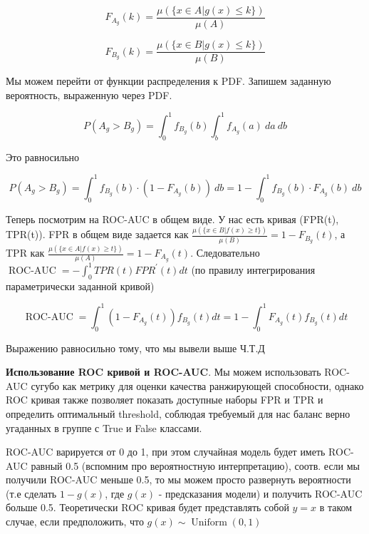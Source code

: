 \documentclass{article}
\begin{document}
    \begin{equation}
        F_{A_{g}}(k) = \frac{\mu(\{x \in A | g(x) \leq k\})}{\mu(A)}
    \end{equation}

    \begin{equation}
        F_{B_{g}}(k) = \frac{\mu(\{x \in B | g(x) \leq k\})}{\mu(B)}
    \end{equation}

    Мы можем перейти от функции распределения к PDF. Запишем заданную вероятность, выраженную через PDF.

    \begin{equation}
        P(A_{g} > B_{g}) = \int_{0}^{1} f_{B_{g}}(b) \int_{b}^{1} f_{A_{g}}(a) \ da \ db
    \end{equation}

    Это равносильно 

    \begin{equation}
        P(A_{g} > B_{g}) = \int_{0}^{1} f_{B_{g}}(b) \cdot (1 - F_{A_{g}}(b)) \ db = 1 - \int_{0}^{1} f_{B_{g}}(b) \cdot F_{A_{g}}(b) \ db
    \end{equation}

    Теперь посмотрим на ROC-AUC в общем виде. 
    У нас есть кривая (FPR(t), TPR(t)). 
    FPR в общем виде задается как $\frac{\mu(\{x \in B | f(x) \geq t\})}{\mu(B)} = 1 - F_{B_{g}}(t)$, 
    а TPR как $\frac{\mu(\{x \in A | f(x) \geq t\})}{\mu(A)} = 1 - F_{A_{g}}(t)$. Следовательно 
    $\operatorname{ROC-AUC} = - \int_{0}^{1} TPR(t) FPR^{'}(t) dt$ 
    (по правилу интегрирования параметрически заданной кривой)

    \begin{equation}
       \operatorname{ROC-AUC} = \int_{0}^{1} (1 - F_{A_{g}}(t)) f_{B_{g}}(t) dt = 1 - \int_{0}^{1} F_{A_{g}}(t) f_{B_{g}}(t) dt
    \end{equation}

    Выражению равносильно тому, что мы вывели выше Ч.Т.Д 

    \quad 

    \textbf{Использование ROC кривой и ROC-AUC}. Мы можем использовать ROC-AUC сугубо как метрику для оценки качества ранжирующей 
    способности, однако ROC кривая также позволяет показать доступные наборы FPR и TPR и определить оптимальный threshold, 
    соблюдая требуемый для нас баланс верно угаданных в группе с True и False классами. 

    ROC-AUC варируется от 0 до 1, при этом случайная модель будет иметь ROC-AUC равный 0.5 (вспомним про вероятностную интерпретацию), соотв. 
    если мы получили ROC-AUC меньше 0.5, то мы можем просто развернуть вероятности (т.е сделать $1 - g(x)$, где $g(x)$ - предсказания 
    модели) и получить ROC-AUC больше 0.5. Теоретически ROC кривая будет представлять собой $y=x$ в таком случае, если 
    предположить, что $g(x) \sim \operatorname{Uniform}(0, 1)$
\end{document}
